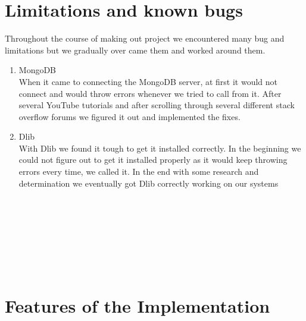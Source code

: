 \documentclass{article}
\begin{document}
\section{Limitations and known bugs}
Throughout the course of making out project we encountered many bug and limitations but we gradually over came them and worked around them.
\begin{enumerate}
\item MongoDB \\
When it came to connecting the MongoDB server, at first it would not connect and would throw errors whenever we tried to call from it. After several YouTube tutorials and after scrolling through several different stack overflow forums we figured it out and implemented the fixes. 
\item Dlib \\
With Dlib we found it tough to get it installed correctly. In the beginning we could not figure out to get it installed properly as it would keep throwing errors every time, we called it. In the end with some research and determination we eventually got Dlib correctly working on our systems
\\
\\
\\
\\
\\
\\
\\
\\

\end{enumerate}

\newpage

\section{Features of the Implementation}
\end{document}
